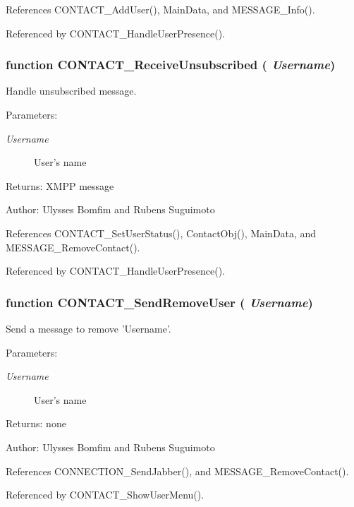 References CONTACT\_\-AddUser(), MainData, and MESSAGE\_\-Info().

Referenced by CONTACT\_\-HandleUserPresence().
\subsubsection[CONTACT\_\-ReceiveUnsubscribed]{\setlength{\rightskip}{0pt plus 5cm}function CONTACT\_\-ReceiveUnsubscribed ( {\em Username})}\label{invite_8js_aa0fa0af2b65fc5353c7d385a0ba0907}


Handle unsubscribed message. 

\begin{Desc}
\item[Parameters:]
\begin{description}
\item[{\em Username}]User's name \end{description}
\end{Desc}
\begin{Desc}
\item[Returns:]XMPP message \end{Desc}
\begin{Desc}
\item[Author:]Ulysses Bomfim and Rubens Suguimoto \end{Desc}


References CONTACT\_\-SetUserStatus(), ContactObj(), MainData, and MESSAGE\_\-RemoveContact().

Referenced by CONTACT\_\-HandleUserPresence().
\subsubsection[CONTACT\_\-SendRemoveUser]{\setlength{\rightskip}{0pt plus 5cm}function CONTACT\_\-SendRemoveUser ( {\em Username})}\label{invite_8js_677f707f79002e64eab16a47ee7b4c4a}


Send a message to remove 'Username'. 

\begin{Desc}
\item[Parameters:]
\begin{description}
\item[{\em Username}]User's name \end{description}
\end{Desc}
\begin{Desc}
\item[Returns:]none \end{Desc}
\begin{Desc}
\item[Author:]Ulysses Bomfim and Rubens Suguimoto \end{Desc}


References CONNECTION\_\-SendJabber(), and MESSAGE\_\-RemoveContact().

Referenced by CONTACT\_\-ShowUserMenu().